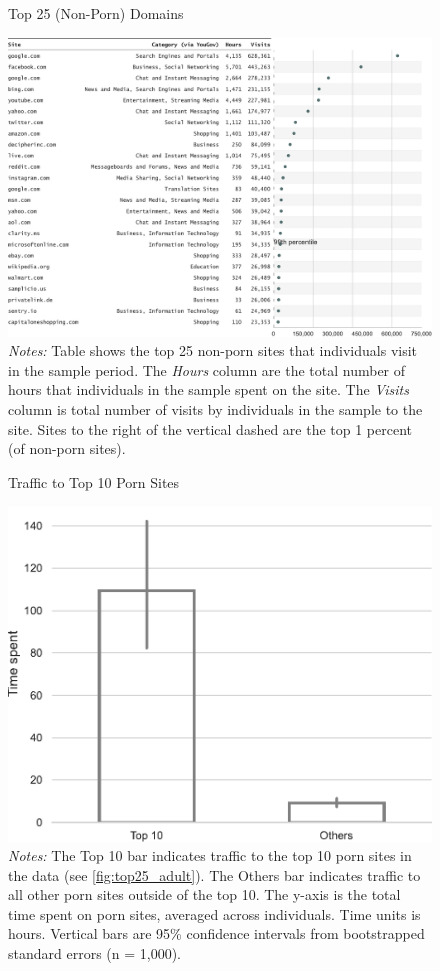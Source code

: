 \documentclass[12pt, letterpaper]{article}
\begin{document}
\begin{figure}
	\centering
	\caption{Top 25 (Non-Porn) Domains}
	\includegraphics[width=\textwidth]{../figs/top_25_nonadultsites.pdf}
	\caption*{\footnotesize \emph{Notes:} 
		Table shows the top 25 non-porn sites that individuals visit in the sample period.
		The \emph{Hours} column are the total number of hours that individuals in the sample spent on the site. 
		The \emph{Visits} column is total number of visits by individuals in the sample to the site.  			
		Sites to the right of the vertical dashed are the top 1 percent (of non-porn sites).
	}
	\label{fig:top25_nonadult}
\end{figure}


\begin{figure}
	\centering
	\caption{Traffic to Top 10 Porn Sites}
	\includegraphics[width=.5\textwidth]{../figs/concentration_porn_consumption.pdf}
	\caption*{\footnotesize \emph{Notes:} 
		The Top 10 bar indicates traffic to the top 10 porn sites in the data (see \cref{fig:top25_adult}).
		The Others bar indicates traffic to all other porn sites outside of the top 10.
		The y-axis is the total time spent on porn sites, averaged across individuals.
		Time units is hours.
		Vertical bars are 95\% confidence intervals from bootstrapped standard errors (n = 1,000).
	}
	\label{fig:concentration_porn_consumption}
\end{figure}
\end{document}
